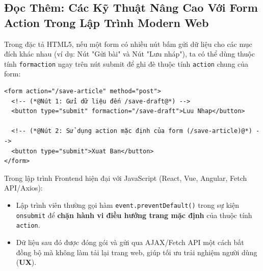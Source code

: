 \documentclass[11pt,oneside]{book}
\newcommand{\codeinline}[1]{\textcolor{accentOrange}{\texttt{#1}}}
\newcommand{\term}[1]{\textbf{\textcolor{primaryBlue}{#1}}}
\begin{document}
\subsection{Đọc Thêm: Các Kỹ Thuật Nâng Cao Với Form Action Trong Lập Trình Modern Web}

\begin{conceptBox}
Trong đặc tả HTML5, nếu một form có nhiều nút bấm gửi dữ liệu cho các mục đích khác nhau (ví dụ: Nút "Gửi bài" và Nút "Lưu nháp"), ta có thể dùng thuộc tính \codeinline{formaction} ngay trên nút submit để ghi đè thuộc tính \codeinline{action} chung của form:
\begin{codeWindow}
\begin{lstlisting}[language=HTML5]
<form action="/save-article" method="post">
  <!-- (*@Nút 1: Gửi dữ liệu đến /save-draft@*) -->
  <button type="submit" formaction="/save-draft">Luu Nhap</button>
  
  <!-- (*@Nút 2: Sử dụng action mặc định của form (/save-article)@*) -->
  <button type="submit">Xuat Ban</button>
</form>
\end{lstlisting}
\end{codeWindow}
\end{conceptBox}

\begin{tipBox}
Trong lập trình Frontend hiện đại với JavaScript (React, Vue, Angular, Fetch API/Axios):
\begin{itemize}[leftmargin=1.5em, itemsep=2pt, parsep=0pt]
    \item Lập trình viên thường gọi hàm \codeinline{event.preventDefault()} trong sự kiện \codeinline{onsubmit} để \textbf{chặn hành vi điều hướng trang mặc định} của thuộc tính \codeinline{action}.
    \item Dữ liệu sau đó được đóng gói và gửi qua AJAX/Fetch API một cách bất đồng bộ mà không làm tải lại trang web, giúp tối ưu trải nghiệm người dùng (\term{UX}).
\end{itemize}
\end{tipBox}
\end{document}
